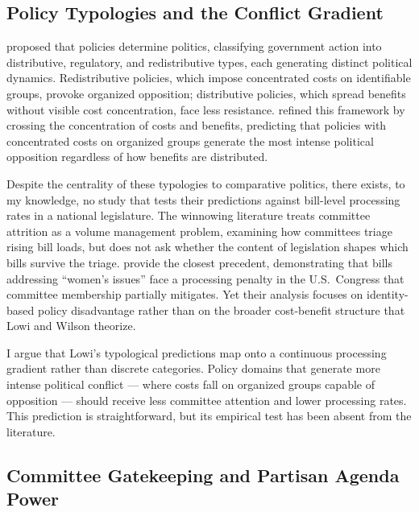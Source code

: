 \documentclass[11pt]{article}
\begin{document}
\subsection{Policy Typologies and the Conflict Gradient}

\citet{lowi1964} proposed that policies determine politics, classifying government action into distributive, regulatory, and redistributive types, each generating distinct political dynamics. Redistributive policies, which impose concentrated costs on identifiable groups, provoke organized opposition; distributive policies, which spread benefits without visible cost concentration, face less resistance. \citet{wilson1980} refined this framework by crossing the concentration of costs and benefits, predicting that policies with concentrated costs on organized groups generate the most intense political opposition regardless of how benefits are distributed.

Despite the centrality of these typologies to comparative politics, there exists, to my knowledge, no study that tests their predictions against bill-level processing rates in a national legislature. The winnowing literature \citep{krutz2005} treats committee attrition as a volume management problem, examining how committees triage rising bill loads, but does not ask whether the content of legislation shapes which bills survive the triage. \citet{volden2016} provide the closest precedent, demonstrating that bills addressing ``women's issues'' face a processing penalty in the U.S.\ Congress that committee membership partially mitigates. Yet their analysis focuses on identity-based policy disadvantage rather than on the broader cost-benefit structure that Lowi and Wilson theorize.

I argue that Lowi's typological predictions map onto a continuous processing gradient rather than discrete categories. Policy domains that generate more intense political conflict --- where costs fall on organized groups capable of opposition --- should receive less committee attention and lower processing rates. This prediction is straightforward, but its empirical test has been absent from the literature.

\subsection{Committee Gatekeeping and Partisan Agenda Power}
\end{document}
